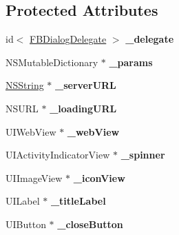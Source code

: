 \subsection*{\-Protected \-Attributes}
\begin{DoxyCompactItemize}
\item 
\hypertarget{interface_f_b_dialog_a7946e817cb1cb8450dd91821be9ee66a}{
id$<$ \hyperlink{protocol_f_b_dialog_delegate-p}{\-F\-B\-Dialog\-Delegate} $>$ {\bfseries \-\_\-delegate}}
\label{interface_f_b_dialog_a7946e817cb1cb8450dd91821be9ee66a}

\item 
\hypertarget{interface_f_b_dialog_a696eceb0e70b6c5c89f8de8f32485d18}{
\-N\-S\-Mutable\-Dictionary $\ast$ {\bfseries \-\_\-params}}
\label{interface_f_b_dialog_a696eceb0e70b6c5c89f8de8f32485d18}

\item 
\hypertarget{interface_f_b_dialog_ad278ce3892c3c3c8cd9229f842679606}{
\hyperlink{class_n_s_string}{\-N\-S\-String} $\ast$ {\bfseries \-\_\-server\-U\-R\-L}}
\label{interface_f_b_dialog_ad278ce3892c3c3c8cd9229f842679606}

\item 
\hypertarget{interface_f_b_dialog_a6120401d7fd8979665d1a447af164d9f}{
\-N\-S\-U\-R\-L $\ast$ {\bfseries \-\_\-loading\-U\-R\-L}}
\label{interface_f_b_dialog_a6120401d7fd8979665d1a447af164d9f}

\item 
\hypertarget{interface_f_b_dialog_a33f638655e1fbd1843cfe3fc378cc169}{
\-U\-I\-Web\-View $\ast$ {\bfseries \-\_\-web\-View}}
\label{interface_f_b_dialog_a33f638655e1fbd1843cfe3fc378cc169}

\item 
\hypertarget{interface_f_b_dialog_a4bd0adcc912b0574b6ca1e294566fa05}{
\-U\-I\-Activity\-Indicator\-View $\ast$ {\bfseries \-\_\-spinner}}
\label{interface_f_b_dialog_a4bd0adcc912b0574b6ca1e294566fa05}

\item 
\hypertarget{interface_f_b_dialog_a260fcc3f0896025080a486c68255df85}{
\-U\-I\-Image\-View $\ast$ {\bfseries \-\_\-icon\-View}}
\label{interface_f_b_dialog_a260fcc3f0896025080a486c68255df85}

\item 
\hypertarget{interface_f_b_dialog_a889c08629b5cc3e20da42e6806f217aa}{
\-U\-I\-Label $\ast$ {\bfseries \-\_\-title\-Label}}
\label{interface_f_b_dialog_a889c08629b5cc3e20da42e6806f217aa}

\item 
\hypertarget{interface_f_b_dialog_a4a38348c4231506f5689ce8f26d96f37}{
\-U\-I\-Button $\ast$ {\bfseries \-\_\-close\-Button}}
\label{interface_f_b_dialog_a4a38348c4231506f5689ce8f26d96f37}


\end{DoxyCompactItemize}
